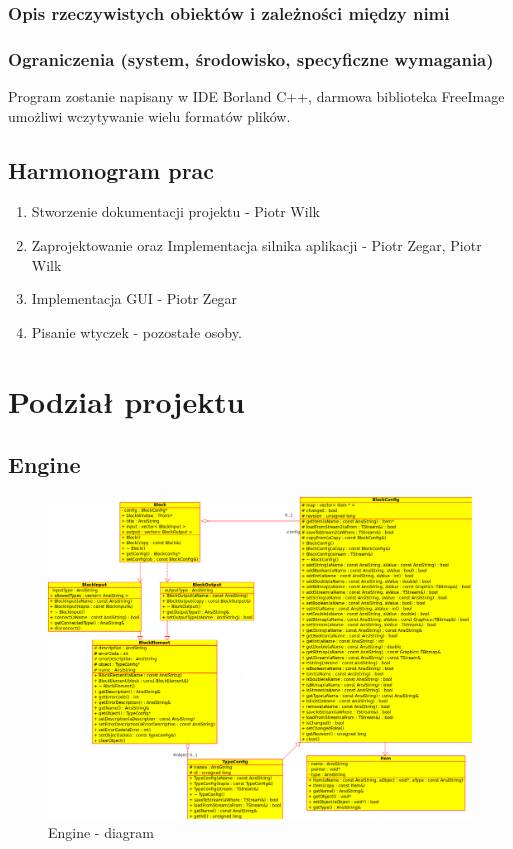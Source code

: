 \subsubsection{Opis rzeczywistych obiektów i zależności między nimi}

\subsubsection{Ograniczenia (system, środowisko, specyficzne wymagania)}
Program zostanie napisany w IDE Borland C++, darmowa biblioteka FreeImage umożliwi wczytywanie wielu formatów plików.
\subsection{Harmonogram prac}
\begin{enumerate}
 \item Stworzenie dokumentacji projektu - Piotr Wilk
 \item Zaprojektowanie oraz Implementacja silnika aplikacji - Piotr Zegar, Piotr Wilk
 \item Implementacja GUI - Piotr Zegar
 \item Pisanie wtyczek - pozostałe osoby.
\end{enumerate}
\section{Podział projektu}
\subsection{Engine}
\begin{figure}[h]
 \centering
 \includegraphics[scale=0.4]{diagram-engine.png}
 \caption{Engine - diagram}
 \label{fig:engine}
\end{figure}
\newpage
